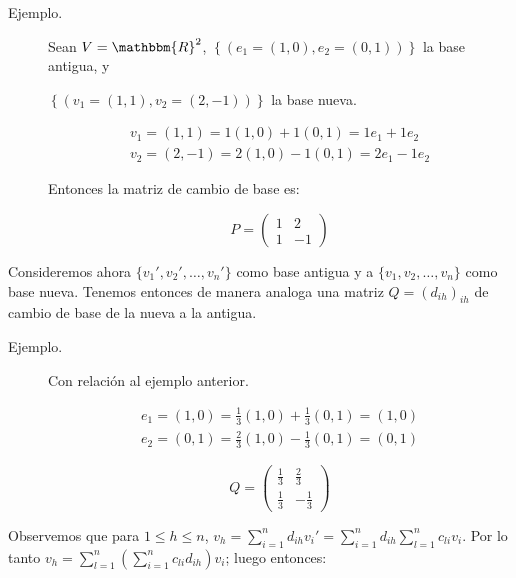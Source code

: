 \documentclass[12pt]{article}
\begin{document}
\begin{description}
\item [Ejemplo.] Sean $V = \mathbbm{R}^2$, $\left\{ \left( e_1 = (1, 0), e_2 = (0, 1) \right) \right\}$ la base antigua, y 

$\left\{ \left( v_1 = (1, 1), v_2 = (2, -1) \right) \right\}$ la base nueva.

\begin{eqnarray}
v_1 = (1, 1) = 1 (1, 0) + 1 (0, 1) = 1 e_1 + 1 e_2 \nonumber \\
v_2 = (2, -1) = 2 (1, 0) - 1 (0, 1) = 2 e_1 - 1 e_2 \nonumber
\end{eqnarray}

Entonces la matriz de cambio de base es:

\begin{equation}
	P =
	\begin{pmatrix}
	1 & 2 \\
	1 & -1
	\end{pmatrix}\nonumber
	\end{equation}
\end{description}

Consideremos ahora $\{ v_1', v_2', \dots, v_n' \}$ como base antigua y a $\{ v_1, v_2, \dots, v_n \}$ como base nueva. Tenemos entonces de manera analoga una matriz $Q = \left( d_{ih} \right)_{ih}$ de cambio de base de la nueva a la antigua.

\begin{description}
	\item [Ejemplo.] Con relación al ejemplo anterior.

	\begin{eqnarray}
	e_1 = (1, 0) = \frac{1}{3} (1, 0) + \frac{1}{3} (0, 1) = (1, 0) \nonumber \\
	e_2 = (0, 1) = \frac{2}{3} (1, 0) - \frac{1}{3} (0, 1) = (0, 1) \nonumber
	\end{eqnarray}

	\begin{equation}
	Q =
	\begin{pmatrix}
	\frac{1}{3} & \frac{2}{3} \\
	\frac{1}{3} & -\frac{1}{3}
	\end{pmatrix}\nonumber
	\end{equation}
\end{description}

Observemos que para $1 \le h \le n$, $v_h = \sum\limits_{i=1}^{n} d_{ih} v_i' = \sum\limits_{i=1}^{n} d_{ih} \sum\limits_{l=1}^{n} c_{li} v_i$. Por lo tanto $v_h = \sum\limits_{l=1}^{n} \left( \sum\limits_{i=1}^{n} c_{li} d_{ih} \right) v_i$; luego entonces:
\end{document}

